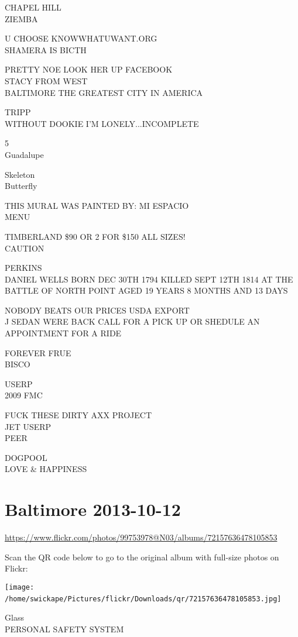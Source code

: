\documentclass[10pt,letterpaper]{article}
\begin{document}
CHAPEL HILL\\
ZIEMBA

U CHOOSE KNOWWHATUWANT.ORG\\
SHAMERA IS BICTH

PRETTY NOE LOOK HER UP FACEBOOK\\
STACY FROM WEST\\
BALTIMORE THE GREATEST CITY IN AMERICA

TRIPP\\
WITHOUT DOOKIE I'M LONELY...INCOMPLETE

5\\
Guadalupe

Skeleton\\
Butterfly

THIS MURAL WAS PAINTED BY: MI ESPACIO\\
MENU

TIMBERLAND \$90 OR 2 FOR \$150 ALL SIZES!\\
CAUTION

PERKINS\\
DANIEL WELLS BORN DEC 30TH 1794 KILLED SEPT 12TH 1814 AT THE BATTLE OF NORTH POINT AGED 19 YEARS 8 MONTHS AND 13 DAYS

NOBODY BEATS OUR PRICES USDA EXPORT\\
J SEDAN WERE BACK CALL FOR A PICK UP OR SHEDULE AN APPOINTMENT FOR A RIDE

FOREVER FRUE\\
BISCO

USERP\\
2009 FMC

FUCK THESE DIRTY AXX PROJECT\\
JET USERP\\
PEER

DOGPOOL\\
LOVE \& HAPPINESS
\

\section*{Baltimore 2013-10-12}

\url{https://www.flickr.com/photos/99753978@N03/albums/72157636478105853}

Scan the QR code below to go to the original album with full-size photos on Flickr:

\texttt{[image: /home/swickape/Pictures/flickr/Downloads/qr/72157636478105853.jpg]}
\

Glass\\
PERSONAL SAFETY SYSTEM
\end{document}
